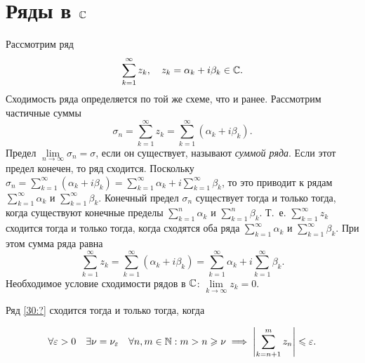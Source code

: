 \documentclass[../../main.tex]{subfiles}
\begin{document}
\section{Ряды в $\mathbb{C}$}
Рассмотрим ряд
\begin{equation}
\label{30:?}
\sum\limits_{k = 1}^{\infty} z_k , \quad z_k =
\alpha_k + i\beta_k \in \mathbb{C}. 
\end{equation}
Сходимость ряда определяется по той же схеме, что и ранее. Рассмотрим 
частичные суммы
\[ \sigma_n = \sum\limits_{k = 1}^{\infty} z_k =
\sum\limits_{k = 1}^{\infty} (\alpha_k + i\beta_k).\]
Предел $\lim\limits_{n \to \infty} \sigma_n = \sigma$,
если он существует, называют \emph{суммой ряда}. Если этот предел конечен, то 
ряд сходится.
Поскольку $\sigma_n = \sum\limits_{k = 1}^{\infty} (\alpha_k + i\beta_k) =
\sum\limits_{k = 1}^{\infty} \alpha_k +
i \sum\limits_{k = 1}^{\infty} \beta_k$,
то это приводит к рядам $\sum\limits_{k = 1}^{\infty} \alpha_k$ и
$\sum\limits_{k = 1}^{\infty} \beta_k$.
Конечный предел $\sigma_n$ существует тогда и только тогда, когда
существуют конечные пределы $\sum\limits_{k = 1}^{n} \alpha_k$ и
$\sum\limits_{k = 1}^{n} \beta_k$.
Т.~е. $\sum\limits_{k = 1}^{\infty} z_k$ сходится тогда и только тогда, когда
сходятся оба ряда $\sum\limits_{k = 1}^{\infty} \alpha_k$ и $
\sum\limits_{k = 1}^{\infty} \beta_k$. При этом сумма ряда равна
\[\sum\limits_{k = 1}^{\infty} z_k = \sum\limits_{k = 1}^{\infty}
(\alpha_k + i\beta_k) = \sum\limits_{k = 1}^{\infty} \alpha_k +
i\sum\limits_{k = 1}^{\infty} \beta_k.\]
Необходимое условие сходимости рядов в $\mathbb{C}$: $\lim\limits_{k \to \infty} z_k = 
0$.

\begin{thm} Ряд \eqref{30:?} сходится тогда и только тогда, 
когда

\[ \forall \varepsilon > 0 \quad \exists \nu = \nu_\varepsilon \quad \forall n, m \in \mathbb{N} : 
m > n \geqslant \nu \implies
\left|{\sum_{k=n+1}^m z_n}\right| \leqslant \varepsilon. \]
\end{thm}
\end{document}
